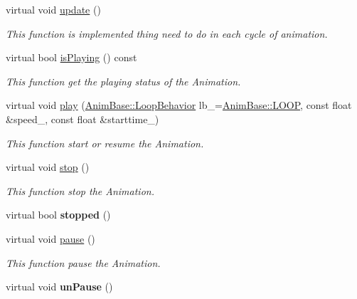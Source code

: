 \begin{DoxyCompactItemize}
virtual void \hyperlink{class_magnum_1_1_skeletal_animation_a2770fe6c5215d7ba5a28df07ac926ae5}{update} ()
\begin{DoxyCompactList}\small\item\em This function is implemented thing need to do in each cycle of animation. \end{DoxyCompactList}\item 
virtual bool \hyperlink{class_magnum_1_1_skeletal_animation_a28d2a4f1c455577300efb48357808007}{is\+Playing} () const 
\begin{DoxyCompactList}\small\item\em This function get the playing status of the Animation. \end{DoxyCompactList}\item 
virtual void \hyperlink{class_magnum_1_1_skeletal_animation_ae5a6fd75843795a5910da79f786da17c}{play} (\hyperlink{class_magnum_1_1_anim_base_ad6b3de9518d395df5ca9865f268ec581}{Anim\+Base\+::\+Loop\+Behavior} lb\+\_\+=\hyperlink{class_magnum_1_1_anim_base_ad6b3de9518d395df5ca9865f268ec581a8b877225f523af406db47b5a700d443f}{Anim\+Base\+::\+L\+O\+OP}, const float \&speed\+\_, const float \&starttime\+\_)
\begin{DoxyCompactList}\small\item\em This function start or resume the Animation. \end{DoxyCompactList}\item 
virtual void \hyperlink{class_magnum_1_1_skeletal_animation_afb285ba851ad7a40f684e753637639ed}{stop} ()
\begin{DoxyCompactList}\small\item\em This function stop the Animation. \end{DoxyCompactList}\item 
virtual bool {\bfseries stopped} ()\hypertarget{class_magnum_1_1_skeletal_animation_a5d3b1b2f4480050d303233f74c68ee67}{}\label{class_magnum_1_1_skeletal_animation_a5d3b1b2f4480050d303233f74c68ee67}

\item 
virtual void \hyperlink{class_magnum_1_1_skeletal_animation_aeac9832834f3356c2fb5f97a0d359729}{pause} ()
\begin{DoxyCompactList}\small\item\em This function pause the Animation. \end{DoxyCompactList}\item 
virtual void {\bfseries un\+Pause} ()\hypertarget{class_magnum_1_1_skeletal_animation_af243b9b3054b75f74b2f48b922bbef45}{}\label{class_magnum_1_1_skeletal_animation_af243b9b3054b75f74b2f48b922bbef45}


\end{DoxyCompactItemize}
